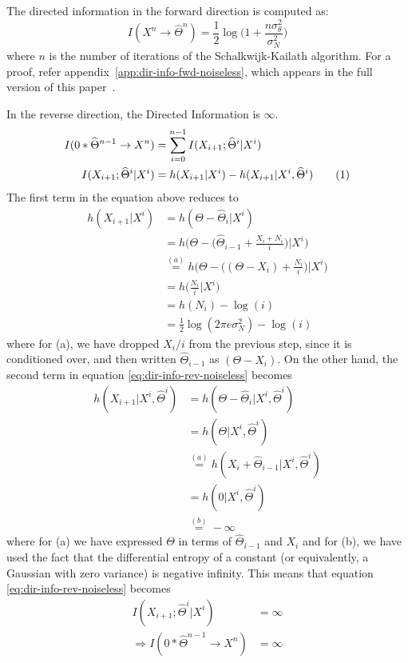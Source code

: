 \documentclass[letterpaper, 10pt, conference]{ieeeconf}
\newcommand\numberthis{\stepcounter{equation}\tag{\theequation}}
\begin{document}
The directed information in the forward direction is computed as:
\begin{equation*}
	I(X^{n} \rightarrow \widehat{\Theta}^{n}) = \frac{1}{2}\log \bigg( 1+\frac{n\sigma_{\theta}^{2}}{\sigma_{N}^{2}} \bigg)
\end{equation*}
where $n$ is the number of iterations of the Schalkwijk-Kailath algorithm. For a proof, refer appendix~\ref{app:dir-info-fwd-noiseless}, which appears in the full version of this paper~\cite{Allerton15Online}.

In the reverse direction, the Directed Information is $\infty$.
\begin{align*}
	I(0*\widehat{\Theta}^{n-1}\rightarrow X^{n}) &= \sum_{i=0}^{n-1}I(X_{i+1};\widehat{\Theta}^{i}|X^{i}) \\
	I(X_{i+1};\widehat{\Theta}^{i}|X^{i})        &= h(X_{i+1}|X^{i}) - h(X_{i+1}|X^{i},\widehat{\Theta}^{i}) \numberthis \label{eq:dir-info-rev-noiseless}
\end{align*}
The first term in the equation above reduces to
\begin{align*}
	h(X_{i+1}|X^{i}) &= h(\Theta-\widehat{\Theta}_{i}|X^{i}) \\
					 &= h \bigg( \Theta- \bigg( \widehat{\Theta}_{i-1}+\frac{X_{i}+N_{i}}{i} \bigg) \bigg| X^{i} \bigg) \\
					 &\overset{(a)}{=} h \bigg( \Theta- \bigg( (\Theta - X_{i}) + \frac{N_{i}}{i} \bigg) \bigg| X^{i} \bigg) \\
					 &= h \bigg( \frac{N_{i}}{i} \bigg| X^{i} \bigg) \\
					 &= h(N_{i}) -\log(i) \\
					 &= \frac{1}{2}\log(2\pi e\sigma_{N}^{2}) -\log(i)
\end{align*}
where for (a), we have dropped $X_i/i$ from the previous step, since it is conditioned over, and then written $\widehat\Theta_{i-1}$ as $(\Theta - X_i)$. On the other hand, the second term in equation \eqref{eq:dir-info-rev-noiseless} becomes
\begin{align*}
	h(X_{i+1} | X^i, \widehat\Theta^i) &= h(\Theta - \widehat\Theta_i | X^i, \widehat\Theta^i) \\
									   &= h(\Theta | X^i, \widehat\Theta^i) \\
									   &\overset{(a)}{=} h(X_i + \widehat\Theta_{i-1} | X^i, \widehat\Theta^i) \\
									   &= h(0 | X^i, \widehat\Theta^i) \\
									   &\overset{(b)}{=} - \infty
\end{align*}
where for (a) we have expressed $\Theta$ in terms of $\widehat\Theta_{i-1}$ and $X_i$ and for (b), we have used the fact that the differential entropy of a constant (or equivalently, a Gaussian with zero variance) is negative infinity. This means that equation \eqref{eq:dir-info-rev-noiseless} becomes
\begin{align*}
	I(X_{i+1};\widehat{\Theta}^{i}|X^{i}) &= \infty \\
	\Rightarrow I(0*\widehat{\Theta}^{n-1}\rightarrow X^{n}) &= \infty
\end{align*}
\end{document}
